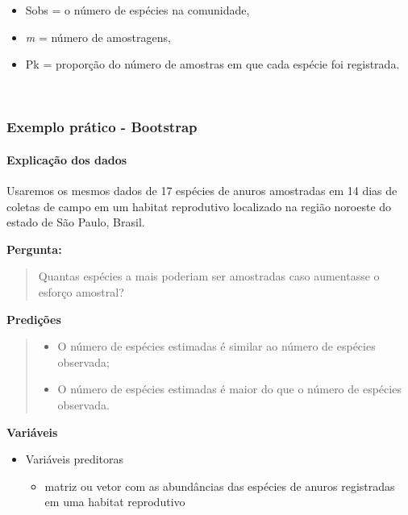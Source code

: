 \documentclass[
]{book}
\providecommand{\tightlist}{%
  \setlength{\itemsep}{0pt}\setlength{\parskip}{0pt}}
\begin{document}
\begin{itemize}
\item
  Sobs = o número de espécies na comunidade,
\item
  \emph{m} = número de amostragens,
\item
  Pk = proporção do número de amostras em que cada espécie foi registrada.
\end{itemize}

~

\hypertarget{exemplo-pruxe1tico---bootstrap}{%
\subsubsection{Exemplo prático - Bootstrap}\label{exemplo-pruxe1tico---bootstrap}}

\hypertarget{explicauxe7uxe3o-dos-dados-5}{%
\paragraph{Explicação dos dados}\label{explicauxe7uxe3o-dos-dados-5}}

Usaremos os mesmos dados de 17 espécies de anuros amostradas em 14 dias de coletas de campo em um habitat reprodutivo localizado na região noroeste do estado de São Paulo, Brasil.

\textbf{Pergunta:}

\begin{quote}
Quantas espécies a mais poderiam ser amostradas caso aumentasse o esforço amostral?
\end{quote}

\textbf{Predições}

\begin{quote}
\begin{itemize}
\tightlist
\item
  O número de espécies estimadas é similar ao número de espécies observada;
\item
  O número de espécies estimadas é maior do que o número de espécies observada.
\end{itemize}
\end{quote}

\textbf{Variáveis}

\begin{itemize}
\tightlist
\item
  Variáveis preditoras

  \begin{itemize}
  \tightlist
  \item
    matriz ou vetor com as abundâncias das espécies de anuros registradas em uma habitat reprodutivo
  \end{itemize}
\end{itemize}
\end{document}
